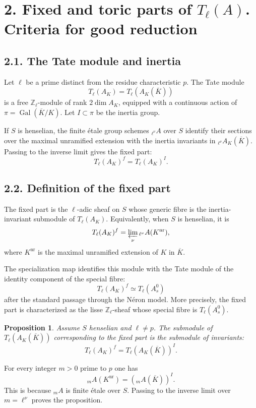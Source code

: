 \documentclass[11pt]{article}
\newtheorem{proposition}{Proposition}[section]
\newcommand{\bZ}{\mathbb Z}
\begin{document}
\section*{2. Fixed and toric parts of \(T_\ell(A)\). Criteria for good reduction}

\subsection*{2.1. The Tate module and inertia}

Let \(\ell\) be a prime distinct from the residue characteristic \(p\). The Tate
module
\[
T_\ell(A_K)=T_\ell(A_K(\overline K))
\]
is a free \(\bZ_\ell\)-module of rank \(2\dim A_K\), equipped with a continuous
action of \(\pi=\operatorname{Gal}(\overline K/K)\). Let \(I\subset \pi\) be the
inertia group.

If \(S\) is henselian, the finite étale group schemes \({}_{\ell^\nu}A\) over
\(S\) identify their sections over the maximal unramified extension with the
inertia invariants in \({}_{\ell^\nu}A_K(\overline K)\). Passing to the inverse
limit gives the fixed part:
\[
T_\ell(A_K)^f=T_\ell(A_K)^I.
\]

\subsection*{2.2. Definition of the fixed part}

The fixed part is the \(\ell\)-adic sheaf on \(S\) whose generic fibre is the
inertia-invariant submodule of \(T_\ell(A_K)\). Equivalently, when \(S\) is
henselian, it is
\[
T_\ell(A_K)^f=\varprojlim_\nu
{}_{\ell^\nu}A(K^{\operatorname{nr}}),
\]
where \(K^{\operatorname{nr}}\) is the maximal unramified extension of \(K\) in
\(\overline K\).

The specialization map identifies this module with the Tate module of the
identity component of the special fibre:
\[
T_\ell(A_K)^f\simeq T_\ell(A_s^0)
\]
after the standard passage through the Néron model. More precisely, the fixed
part is characterized as the lisse \(\bZ_\ell\)-sheaf whose special fibre is
\(T_\ell(A_s^0)\).

\begin{proposition}
Assume \(S\) henselian and \(\ell\neq p\). The submodule of
\(T_\ell(A_K(\overline K))\) corresponding to the fixed part is the submodule of
invariants:
\[
T_\ell(A_K)^f=T_\ell(A_K(\overline K))^I.
\]
\end{proposition}

For every integer \(m>0\) prime to \(p\) one has
\[
{}_mA(K^{\operatorname{nr}})
=({}_mA(\overline K))^I.
\]
This is because \({}_mA\) is finite étale over \(S\). Passing to the inverse
limit over \(m=\ell^\nu\) proves the proposition.
\end{document}
